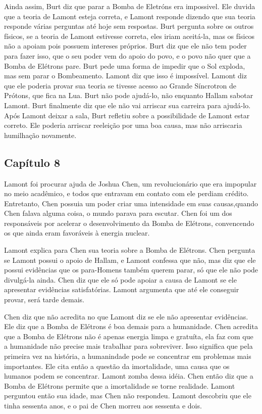 \documentclass[14pt,portuguese]{extreport}
\begin{document}
    	  Ainda assim, Burt diz que parar a Bomba de Eletróns era impossivel. Ele duvida que a teoria de Lamont esteja correta, e Lamont responde dizendo que sua teoria responde várias perguntas até hoje sem respostas. Burt pergunta sobre os outros físicos, se a teoria de Lamont estivesse correta, eles iriam aceitá-la, mas os físicos não a apoiam pois possuem intereses próprios. Burt diz que ele não tem poder para fazer isso, que o seu poder vem do apoio do povo, e o povo não quer que a Bomba de Elétrons pare. Burt pede uma forma de impedir que o Sol exploda, mas sem parar o Bombeamento. Lamont diz que isso é impossível. Lamont diz que ele poderia provar sua teoria se tivesse acesso ao Grande Síncrotron de Prótons, que fica na Lua. Burt não pode ajudá-lo, não enquanto Hallam sabotar Lamont. Burt finalmente diz que ele não vai arriscar sua carreira para ajudá-lo. Após Lamont deixar a sala, Burt refletiu sobre a possibilidade de Lamont estar correto. Ele poderia arriscar reeleição por uma boa causa, mas não arriscaria humilhação novamente.

      \subsection{Capítulo 8}

    	  Lamont foi procurar ajuda de Joshua Chen, um revolucionário que era impopular no meio acadêmico, e todos que entravam em contato com ele perdiam crédito. Entretanto, Chen possuia um poder criar uma intensidade em suas causas,quando Chen falava alguma coisa, o mundo parava para escutar. Chen foi um dos responsáveis por acelerar o desenvolvimento da Bomba de Elétrons, convencendo os que ainda eram favoráveis à energia nuclear.
    	  
    	  Lamont explica para Chen sua teoria sobre a Bomba de Elétrons. Chen pergunta se Lamont possui o apoio de Hallam, e Lamont confessa que não, mas diz que ele possui evidências que os para-Homens também querem parar, só que ele não pode divulgá-la ainda. Chen diz que ele só pode apoiar a causa de Lamont se ele apresentar evidências satisfatórias. Lamont argumenta que até ele conseguir provar, será tarde demais. 
    	  
    	  Chen diz que não acredita no que Lamont diz se ele não apresentar evidências. Ele diz que a Bomba de Elétrons é boa demais para a humanidade. Chen acredita que a Bomba de Elétrons não é apenas energia limpa e gratuíta, ela faz com que a humanidade não precise mais trabalhar para sobreviver. Isso significa que pela primeira vez na história, a humanindade pode se concentrar em problemas mais importantes. Ele cita então a questão da imortalidade, uma causa que os humanos podem se concentrar. Lamont zomba dessa idéia. Chen então diz que a Bomba de Elétrons permite que a imortalidade se torne realidade. Lamont perguntou então sua idade, mas Chen não respondeu. Lamont descobriu que ele tinha sessenta anos, e o pai de Chen morreu aos sessenta e dois.
\end{document}
